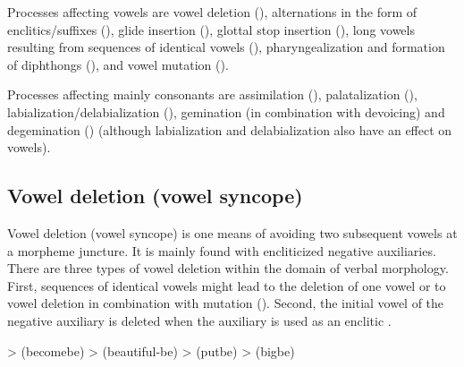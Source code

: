 Processes affecting vowels are vowel deletion (), alternations in the form of enclitics\slash suffixes (), glide insertion (), glottal stop insertion (), long vowels resulting from sequences of identical vowels (), pharyngealization and formation of diphthongs (), and vowel mutation ().

Processes affecting mainly consonants are assimilation (), palatalization (), labialization\slash delabialization (), gemination (in combination with devoicing) and degemination () (although labialization and delabialization also have an effect on vowels).



\subsection{Vowel deletion (vowel syncope)}
\label{ssec:Vowel deletion (vowel syncope)}

Vowel deletion (vowel syncope) is one means of avoiding two subsequent vowels at a morpheme juncture. It is mainly found with encliticized negative auxiliaries. There are three types of vowel deletion within the domain of verbal morphology. First, sequences of identical vowels might lead to the deletion of one vowel or to vowel deletion in combination with mutation (). Second, the initial vowel of the negative auxiliary is deleted when the auxiliary is used as an enclitic .
%
\begin{exe}
	\ex	\label{ex:vowel syncope verbs phon}
	\begin{xlist}
		\ex	{} >  (becomebe)			
		\ex	{} >  (beautiful-be)		
		\ex	{} > \newline\hspace*{1em}(putbe) 
		\ex	{} >  (bigbe)
	\end{xlist}
\end{exe}

